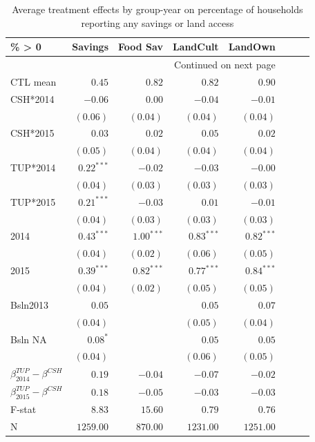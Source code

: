 \documentclass[12pt,article]{article}
\begin{document}
\begin{longtable}{lrrrrrrr}
\caption{\label{tab:Nonzero}Average treatment effects by group-year on percentage of households reporting any savings or land access}
\\
\hline
\% > 0 & Savings & Food Sav & LandCult & LandOwn\\
\hline
\endhead
\hline\multicolumn{5}{r}{Continued on next page} \\
\endfoot
\endlastfoot
CTL mean & $0.45$ & $0.82$ & $0.82$ & $0.90$\\
\hline
CSH*2014 & $-0.06$ & $0.00$ & $-0.04$ & $-0.01$\\
 & $( 0.06)$ & $( 0.04)$ & $( 0.04)$ & $( 0.04)$\\
CSH*2015 & $0.03$ & $0.02$ & $0.05$ & $0.02$\\
 & $( 0.05)$ & $( 0.04)$ & $( 0.04)$ & $( 0.04)$\\
TUP*2014 & $0.22^{***}$ & $-0.02$ & $-0.03$ & $-0.00$\\
 & $( 0.04)$ & $( 0.03)$ & $( 0.03)$ & $( 0.03)$\\
TUP*2015 & $0.21^{***}$ & $-0.03$ & $0.01$ & $-0.01$\\
 & $( 0.04)$ & $( 0.03)$ & $( 0.03)$ & $( 0.03)$\\
2014 & $0.43^{***}$ & $1.00^{***}$ & $0.83^{***}$ & $0.82^{***}$\\
 & $( 0.04)$ & $( 0.02)$ & $( 0.06)$ & $( 0.05)$\\
2015 & $0.39^{***}$ & $0.82^{***}$ & $0.77^{***}$ & $0.84^{***}$\\
 & $( 0.04)$ & $( 0.02)$ & $( 0.05)$ & $( 0.05)$\\
Bsln2013 & $0.05$ &  & $0.05$ & $0.07$\\
 & $( 0.04)$ &  & $( 0.05)$ & $( 0.04)$\\
Bsln NA & $0.08^{*}$ &  & $0.05$ & $0.05$\\
 & $( 0.04)$ &  & $( 0.06)$ & $( 0.05)$\\
\hline
$\beta^{TUP}_{2014}-\beta^{CSH}$ & $0.19$ & $-0.04$ & $-0.07$ & $-0.02$\\
$\beta^{TUP}_{2015}-\beta^{CSH}$ & $0.18$ & $-0.05$ & $-0.03$ & $-0.03$\\
\hline
F-stat & $8.83$ & $15.60$ & $0.79$ & $0.76$\\
N & $1259.00$ & $870.00$ & $1231.00$ & $1251.00$\\
\hline
\end{longtable}
\end{document}
